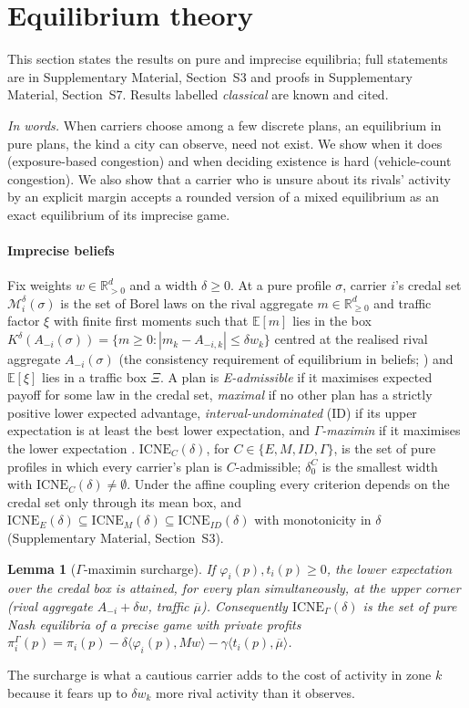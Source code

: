 \documentclass[preprint,11pt]{elsarticle}
\newtheorem{lemma}[theorem]{Lemma}
\theoremstyle{definition}
\theoremstyle{remark}
\newcommand{\R}{\mathbb{R}}
\newcommand{\E}{\mathbb{E}}
\newcommand{\cM}{\mathcal{M}}
\newcommand{\ICNE}{\mathrm{ICNE}}
\newcommand{\ip}[2]{\langle #1,#2\rangle}
\newcommand{\SM}[1]{Supplementary Material, Section~#1}
\begin{document}
\section{Equilibrium theory}\label{sec:theory}

This section states the results on pure and imprecise equilibria; full statements are in \SM{S3} and proofs in \SM{S7}. Results labelled \emph{classical} are known and cited.

\emph{In words.} When carriers choose among a few discrete plans, an equilibrium in pure plans, the kind a city can observe, need not exist. We show when it does (exposure-based congestion) and when deciding existence is hard (vehicle-count congestion). We also show that a carrier who is unsure about its rivals' activity by an explicit margin accepts a rounded version of a mixed equilibrium as an exact equilibrium of its imprecise game.

\paragraph{Imprecise beliefs} Fix weights $w\in\R^d_{>0}$ and a width $\delta\ge0$. At a pure profile $\sigma$, carrier $i$'s credal set $\cM_i^\delta(\sigma)$ is the set of Borel laws on the rival aggregate $m\in\R^d_{\ge0}$ and traffic factor $\xi$ with finite first moments such that $\E[m]$ lies in the box $K^\delta(A_{-i}(\sigma))=\{m\ge0:|m_k-A_{-i,k}|\le\delta w_k\}$ centred at the realised rival aggregate $A_{-i}(\sigma)$ (the consistency requirement of equilibrium in beliefs; \citealt{Lo1996}) and $\E[\xi]$ lies in a traffic box $\Xi$. A plan is \emph{E-admissible} if it maximises expected payoff for some law in the credal set, \emph{maximal} if no other plan has a strictly positive lower expected advantage, \emph{interval-undominated} (ID) if its upper expectation is at least the best lower expectation, and \emph{$\Gamma$-maximin} if it maximises the lower expectation \citep{Troffaes2007}. $\ICNE_C(\delta)$, for $C\in\{E,M,ID,\Gamma\}$, is the set of pure profiles in which every carrier's plan is $C$-admissible; $\delta_0^C$ is the smallest width with $\ICNE_C(\delta)\neq\emptyset$. Under the affine coupling every criterion depends on the credal set only through its mean box, and $\ICNE_E(\delta)\subseteq\ICNE_M(\delta)\subseteq\ICNE_{ID}(\delta)$ with monotonicity in $\delta$ (\SM{S3}).

\begin{lemma}[$\Gamma$-maximin surcharge]\label{lem:gamma}
If $\varphi_i(p),t_i(p)\ge0$, the lower expectation over the credal box is attained, for every plan simultaneously, at the upper corner (rival aggregate $A_{-i}+\delta w$, traffic $\overline\mu$). Consequently $\ICNE_\Gamma(\delta)$ is the set of pure Nash equilibria of a precise game with private profits $\pi_i^\Gamma(p)=\pi_i(p)-\delta\ip{\varphi_i(p)}{Mw}-\gamma\ip{t_i(p)}{\overline\mu}$.
\end{lemma}
The surcharge is what a cautious carrier adds to the cost of activity in zone $k$ because it fears up to $\delta w_k$ more rival activity than it observes.
\end{document}
